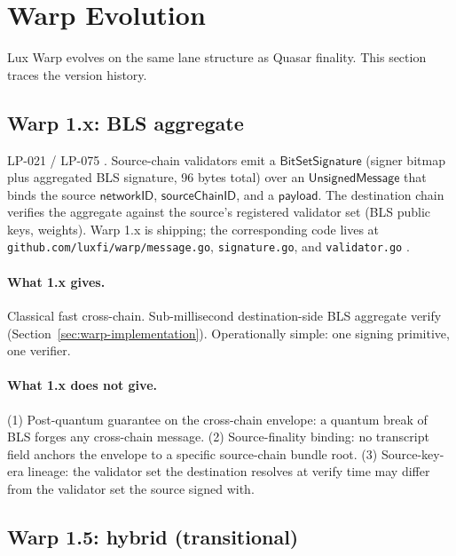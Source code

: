 \section{Warp Evolution}
\label{sec:warp-evolution}

Lux Warp evolves on the same lane structure as Quasar finality. This section traces the version history.

\subsection{Warp 1.x: BLS aggregate}

LP-021 / LP-075 \cite{lp021,lp075}. Source-chain validators emit a $\mathsf{BitSetSignature}$ (signer bitmap plus aggregated BLS signature, 96 bytes total) over an $\mathsf{UnsignedMessage}$ that binds the source $\mathsf{networkID}$, $\mathsf{sourceChainID}$, and a $\mathsf{payload}$. The destination chain verifies the aggregate against the source's registered validator set (BLS public keys, weights). Warp 1.x is shipping; the corresponding code lives at \texttt{github.com/luxfi/warp/message.go}, \texttt{signature.go}, and \texttt{validator.go} \cite{warpgo}.

\paragraph{What 1.x gives.} Classical fast cross-chain. Sub-millisecond destination-side BLS aggregate verify (Section~\ref{sec:warp-implementation}). Operationally simple: one signing primitive, one verifier.

\paragraph{What 1.x does not give.} (1) Post-quantum guarantee on the cross-chain envelope: a quantum break of BLS forges any cross-chain message. (2) Source-finality binding: no transcript field anchors the envelope to a specific source-chain bundle root. (3) Source-key-era lineage: the validator set the destination resolves at verify time may differ from the validator set the source signed with.

\subsection{Warp 1.5: hybrid (transitional)}

